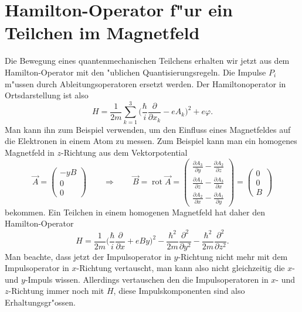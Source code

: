 \section{Hamilton-Operator f"ur ein Teilchen im Magnetfeld\label{section:hamilton-operator-im-magnetfeld}}
Die Bewegung eines quantenmechanischen Teilchens erhalten wir jetzt
aus dem Hamilton-Operator mit den "ublichen Quantisierungsregeln.
Die Impulse $P_i$ m"ussen durch Ableitungsoperatoren ersetzt werden.
Der Hamiltonoperator in Ortsdarstellung ist also
\[
H=\frac1{2m}\sum_{k=1}^3\biggl(
\frac{\hbar}{i}
\frac{\partial}{\partial x_k}
-eA_k
\biggr)^2
+e\varphi.
\]
Man kann ihn zum Beispiel verwenden, um den Einfluss eines Magnetfeldes
auf die Elektronen in einem Atom zu messen.
Zum Beispiel kann man ein homogenes Magnetfeld in $z$-Richtung
aus dem Vektorpotential
\[
\vec A=\begin{pmatrix}
-yB\\0\\0
\end{pmatrix}
\qquad
\Rightarrow
\qquad
\vec B=\operatorname{rot}\vec A
=\begin{pmatrix}
\frac{\partial A_3}{\partial y}-\frac{\partial A_2}{\partial z}\\
\frac{\partial A_1}{\partial z}-\frac{\partial A_3}{\partial x}\\
\frac{\partial A_2}{\partial x}-\frac{\partial A_1}{\partial y}
\end{pmatrix}
=
\begin{pmatrix}
0\\0\\B
\end{pmatrix}
\]
bekommen.
Ein Teilchen in einem homogenen Magnetfeld hat daher den Hamilton-Operator
\[
H
=
\frac1{2m}\biggl(\frac{\hbar}{i}\frac{\partial}{\partial x}+eBy\biggr)^2
-\frac{\hbar^2}{2m}\frac{\partial^2}{\partial y^2}
-\frac{\hbar^2}{2m}\frac{\partial^2}{\partial z^2}.
\]
Man beachte, dass jetzt der Impulsoperator in $y$-Richtung nicht mehr
mit dem Impulsoperator in $x$-Richtung vertauscht, man kann also
nicht gleichzeitig die $x$- und $y$-Impuls wissen.
Allerdings vertauschen den die Impulsoperatoren in $x$- und $z$-Richtung
immer noch mit $H$, diese Impulskomponenten sind also Erhaltungsgr"ossen.

